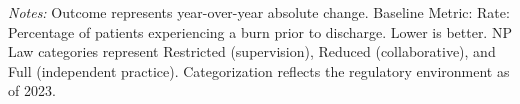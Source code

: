 \begin{table}[htbp]
    \centering
    \caption{Summary of Change in ASC-1: Patient Burns Rate by Authority and Year}
    \label{tab:d_asc_rate_1}
    \vspace{0.2cm}
    \vspace{0.1cm}
    \begin{minipage}{\textwidth}
        \footnotesize \textit{Notes:} Outcome represents year-over-year absolute change. Baseline Metric: Rate: Percentage of patients experiencing a burn prior to discharge. Lower is better. NP Law categories represent Restricted (supervision), Reduced (collaborative), and Full (independent practice). Categorization reflects the regulatory environment as of 2023.
    \end{minipage}
\end{table}